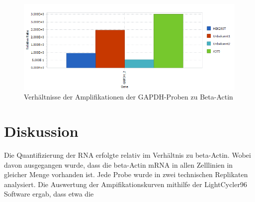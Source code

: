 \documentclass{article}
\begin{document}
\begin{figure}[H]
    \centering
    \includegraphics[width=\textwidth]{images/cycler/G1_2_G2.png}
    \caption{Verhältnisse der Amplifikationen der GAPDH-Proben zu Beta-Actin}
    \label{fig:gapdh2beta}
\end{figure}
\section{Diskussion}

Die Quantifizierung der RNA erfolgte relativ im Verhältnis zu beta-Actin. Wobei davon ausgegangen wurde, dass die beta-Actin mRNA in allen Zelllinien in gleicher Menge vorhanden ist. Jede Probe wurde in zwei technischen Replikaten analysiert. Die Auswertung der Ampifikationskurven mithilfe der LightCycler96 Software ergab, dass etwa die 



\end{document}
